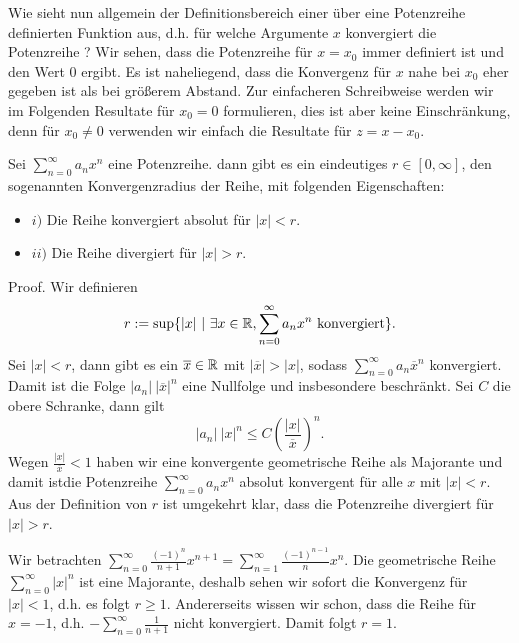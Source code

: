 Wie sieht nun allgemein der Definitionsbereich einer über eine Potenzreihe definierten Funktion aus, d.h. für welche Argumente \(x\) konvergiert die Potenzreihe ? Wir sehen, dass die Potenzreihe für \(x=x_0\) immer definiert ist und den Wert \(0\) ergibt. Es ist naheliegend, dass die Konvergenz für \(x\) nahe bei \(x_0\) eher gegeben ist als bei größerem Abstand. Zur einfacheren Schreibweise werden wir im Folgenden Resultate für \(x_0 = 0\) formulieren, dies ist aber keine Einschränkung, denn für \(x_0 \neq 0\) verwenden wir einfach die Resultate für \(z=x-x_0\).
\label{metrik/potenzreihen:theorem-1}
\begin{theorem}{}{}



Sei \(\sum_{n=0}^\infty a_n x^n\) eine Potenzreihe. dann gibt es ein eindeutiges \(r \in [0,\infty]\), den sogenannten Konvergenzradius der Reihe, mit folgenden Eigenschaften:
\begin{itemize}
\item {} 
\(i)\) Die Reihe konvergiert absolut für \(|x| < r\).

\item {} 
\(ii)\) Die Reihe divergiert für \(|x| > r\).

\end{itemize}
\end{theorem}

\begin{emphBox}{}{}
Proof.  Wir definieren
\begin{equation*}
 r:= \sup\{ |x| ~|~ \exists x \in \mathbb{R}, \sum_{n=0}^\infty a_n x^n \text{ konvergiert} \}.
\end{equation*}
Sei \(|x|<r\), dann gibt es ein \(\overline{x} \in \mathbb{R}\) mit \(|\overline{x}|>|x|\), sodass \(\sum_{n=0}^\infty a_n \overline{x}^n\) konvergiert. Damit ist die Folge \(|a_n|~ |\overline{x}|^n\) eine Nullfolge und insbesondere beschränkt. Sei \(C\) die obere Schranke, dann gilt
\begin{equation*}
|a_n|~ |x|^n \leq C \left( \frac{|x|}{\overline{x}} \right)^n.
\end{equation*}
Wegen \(\frac{|x|}{\overline{x}} < 1\) haben wir eine konvergente geometrische Reihe als Majorante und damit istdie Potenzreihe \(\sum_{n=0}^\infty a_n x^n \) absolut konvergent für alle \(x\) mit \(|x|<r\).
Aus der Definition von  \(r\) ist umgekehrt klar, dass die Potenzreihe divergiert für \(|x|>r\).
\end{emphBox}
\label{metrik/potenzreihen:example-2}
\begin{example}{}{}



Wir betrachten \(\sum_{n=0}^\infty \frac{(-1)^{n}}{n+1}x^{n+1} = \sum_{n=1}^\infty \frac{(-1)^{n-1}}{n}x^{n}. \)
Die geometrische Reihe \(\sum_{n=0}^\infty |x|^n\) ist eine Majorante, deshalb sehen wir sofort die Konvergenz für \(|x| < 1\), d.h. es folgt \(r \geq 1\). Andererseits wissen wir schon, dass die Reihe für \(x=-1\), d.h. \(-
\sum_{n=0}^\infty \frac{1}{n+1}\) nicht konvergiert. Damit folgt \(r=1\).
\end{example}


